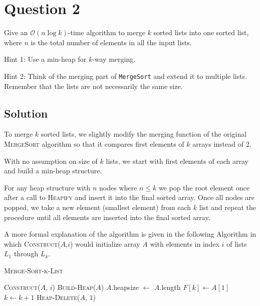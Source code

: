 
\section*{Question 2}
Give an $\mathcal{O}(n \log k)$-time algorithm to merge $k$ sorted lists into one sorted list, where $n$ is the total number of elements in all the input lists.

Hint 1: Use a min-heap for $k$-way merging.

Hint 2: Think of the merging part of \texttt{MergeSort} and extend it to multiple lists. Remember that the lists are not necessarily the same size.

\subsection*{Solution}

To merge $k$ sorted lists, we slightly modify the merging function of the original \textsc{MergeSort} algorithm so that it compares first elements of $k$ arrays instead of 2.

With no assumption on size of $k$ lists, we start with first elements of each array and build a min-heap structure.

For any heap structure with $n$ nodes where $n \leq k$ we pop the root element once after a call to \textsc{Heapify} and insert it into the final sorted array. Once all nodes are popped, we take a new element (smallest element) from each $k$ list and repeat the procedure until all elements are inserted into the final sorted array.

A more formal explanation of the algorithm is given in the following Algorithm in which \textsc{Construct}($A$,$i$) would initialize array $A$ with elements in index $i$ of lists $L_1$ through $L_k$.

\begin{algorithm}[H]
\caption{\textsc{Merge-Sort-k-List}}
\begin{algorithmic}[1]
\State \textsc{Construct}($A$, $i$)
\State \textsc{Build-Heap}($A$)
\State $A$.heapsize $\leftarrow$ $A$.length
\State $F[k] \leftarrow A[1]$
\State $k \leftarrow k + 1$
\State \textsc{Heap-Delete}($A$, $1$)
\EndFor
\EndFor
\end{algorithmic}
\end{algorithm}

